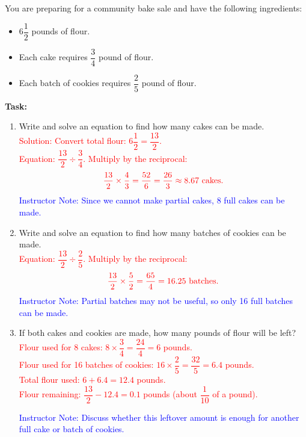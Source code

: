 \documentclass[12pt]{article}
\begin{document}
\begin{tcolorbox}[colframe=black!60, colback=white, 
coltitle=black, colbacktitle=black!15, fonttitle=\bfseries\Large, 
title=Performance Task: Sharing Ingredients, halign title=center, left=10pt, right=10pt, top=10pt, bottom=40pt]
You are preparing for a community bake sale and have the following ingredients:
\begin{itemize}[itemsep=.2em]
    \item \( 6 \dfrac{1}{2} \) pounds of flour.
    \item Each cake requires \( \dfrac{3}{4} \) pound of flour.
    \item Each batch of cookies requires \( \dfrac{2}{5} \) pound of flour.
\end{itemize}
\textbf{Task:}
\begin{enumerate}[itemsep=2em]
    \item Write and solve an equation to find how many cakes can be made. \\
    \textcolor{red}{Solution: Convert total flour: \( 6 \dfrac{1}{2} = \dfrac{13}{2} \).} \\
    \textcolor{red}{Equation: \( \dfrac{13}{2} \div \dfrac{3}{4} \). Multiply by the reciprocal:} \\
    \[
    \textcolor{red}{\dfrac{13}{2} \times \dfrac{4}{3} = \dfrac{52}{6} = \dfrac{26}{3} \approx 8.67 \text{ cakes}.}
    \]
    \textcolor{blue}{Instructor Note: Since we cannot make partial cakes, 8 full cakes can be made.}

    \item Write and solve an equation to find how many batches of cookies can be made. \\
    \textcolor{red}{Equation: \( \dfrac{13}{2} \div \dfrac{2}{5} \). Multiply by the reciprocal:} \\
    \[
    \textcolor{red}{\dfrac{13}{2} \times \dfrac{5}{2} = \dfrac{65}{4} = 16.25 \text{ batches}.}
    \]
    \textcolor{blue}{Instructor Note: Partial batches may not be useful, so only 16 full batches can be made.}

    \item If both cakes and cookies are made, how many pounds of flour will be left? \\
    \textcolor{red}{Flour used for 8 cakes: \( 8 \times \dfrac{3}{4} = \dfrac{24}{4} = 6 \) pounds.} \\
    \textcolor{red}{Flour used for 16 batches of cookies: \( 16 \times \dfrac{2}{5} = \dfrac{32}{5} = 6.4 \) pounds.} \\
    \textcolor{red}{Total flour used: \( 6 + 6.4 = 12.4 \) pounds.} \\
    \textcolor{red}{Flour remaining: \( \dfrac{13}{2} - 12.4 = 0.1 \) pounds (about \( \dfrac{1}{10} \) of a pound).}
    
    \textcolor{blue}{Instructor Note: Discuss whether this leftover amount is enough for another full cake or batch of cookies.}
\end{enumerate}
\end{tcolorbox}
\end{document}
